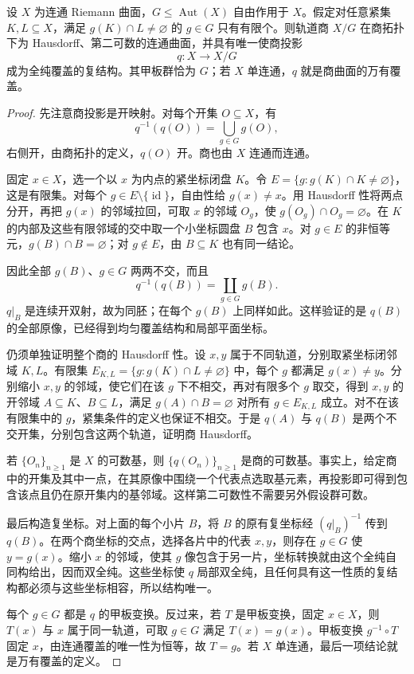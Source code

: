 \begin{proposition}[自由适当不连续作用的商]\label{b3:prop:11-proper-action-quotient}
设 \(X\) 为连通 Riemann 曲面，\(G\le\operatorname{Aut}(X)\) 自由作用于 \(X\)。假定对任意紧集 \(K,L\subseteq X\)，满足 \(g(K)\cap L\ne\varnothing\) 的 \(g\in G\) 只有有限个。则轨道商 \(X/G\) 在商拓扑下为 Hausdorff、第二可数的连通曲面，并具有唯一使商投影
\[
 q:X\longrightarrow X/G
\]
成为全纯覆盖的复结构。其甲板群恰为 \(G\)；若 \(X\) 单连通，\(q\) 就是商曲面的万有覆盖。
\end{proposition}
\begin{proof}
先注意商投影是开映射。对每个开集 \(O\subseteq X\)，有
\[
 q^{-1}(q(O))=\bigcup_{g\in G}g(O),
\]
右侧开，由商拓扑的定义，\(q(O)\) 开。商也由 \(X\) 连通而连通。

固定 \(x\in X\)，选一个以 \(x\) 为内点的紧坐标闭盘 \(K\)。令 \(E=\{g:g(K)\cap K\ne\varnothing\}\)，这是有限集。对每个 \(g\in E\setminus\{\operatorname{id}\}\)，自由性给 \(g(x)\ne x\)。用 Hausdorff 性将两点分开，再把 \(g(x)\) 的邻域拉回，可取 \(x\) 的邻域 \(O_g\)，使 \(g(O_g)\cap O_g=\varnothing\)。在 \(K\) 的内部及这些有限邻域的交中取一个小坐标圆盘 \(B\) 包含 \(x\)。对 \(g\in E\) 的非恒等元，\(g(B)\cap B=\varnothing\)；对 \(g\notin E\)，由 \(B\subseteq K\) 也有同一结论。

因此全部 \(g(B)\)、\(g\in G\) 两两不交，而且
\[
 q^{-1}(q(B))=\coprod_{g\in G}g(B).
\]
\(q|_B\) 是连续开双射，故为同胚；在每个 \(g(B)\) 上同样如此。这样验证的是 \(q(B)\) 的全部原像，已经得到均匀覆盖结构和局部平面坐标。

仍须单独证明整个商的 Hausdorff 性。设 \(x,y\) 属于不同轨道，分别取紧坐标闭邻域 \(K,L\)。有限集 \(E_{K,L}=\{g:g(K)\cap L\ne\varnothing\}\) 中，每个 \(g\) 都满足 \(g(x)\ne y\)。分别缩小 \(x,y\) 的邻域，使它们在该 \(g\) 下不相交，再对有限多个 \(g\) 取交，得到 \(x,y\) 的开邻域 \(A\subseteq K\)、\(B\subseteq L\)，满足 \(g(A)\cap B=\varnothing\) 对所有 \(g\in E_{K,L}\) 成立。对不在该有限集中的 \(g\)，紧集条件的定义也保证不相交。于是 \(q(A)\) 与 \(q(B)\) 是两个不交开集，分别包含这两个轨道，证明商 Hausdorff。

若 \(\{O_n\}_{n\ge1}\) 是 \(X\) 的可数基，则 \(\{q(O_n)\}_{n\ge1}\) 是商的可数基。事实上，给定商中的开集及其中一点，在其原像中围绕一个代表点选取基元素，再投影即可得到包含该点且仍在原开集内的基邻域。这样第二可数性不需要另外假设群可数。

最后构造复坐标。对上面的每个小片 \(B\)，将 \(B\) 的原有复坐标经 \((q|_B)^{-1}\) 传到 \(q(B)\)。在两个商坐标的交点，选择各片中的代表 \(x,y\)，则存在 \(g\in G\) 使 \(y=g(x)\)。缩小 \(x\) 的邻域，使其 \(g\) 像包含于另一片，坐标转换就由这个全纯自同构给出，因而双全纯。这些坐标使 \(q\) 局部双全纯，且任何具有这一性质的复结构都必须与这些坐标相容，所以结构唯一。

每个 \(g\in G\) 都是 \(q\) 的甲板变换。反过来，若 \(T\) 是甲板变换，固定 \(x\in X\)，则 \(T(x)\) 与 \(x\) 属于同一轨道，可取 \(g\in G\) 满足 \(T(x)=g(x)\)。甲板变换 \(g^{-1}\circ T\) 固定 \(x\)，由连通覆盖的唯一性为恒等，故 \(T=g\)。若 \(X\) 单连通，最后一项结论就是万有覆盖的定义。
\end{proof}

